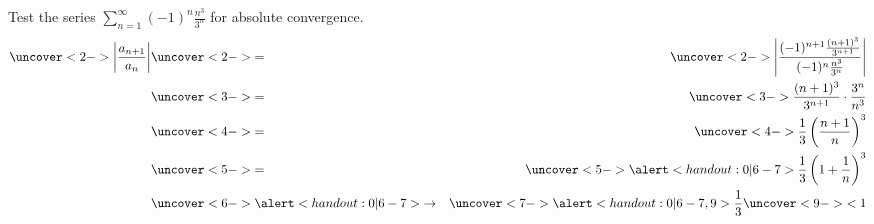\begin{frame}
\begin{example}[Example 4, p. 753]
Test the series $\displaystyle \sum_{n=1}^\infty (-1)^n \frac{n^3}{3^n}$ for absolute convergence.
\abovedisplayskip=0pt
\belowdisplayskip=0pt
\begin{eqnarray*}
\uncover<2->{%
\left| \frac{a_{n+1}}{a_n}\right| %
}%
 & \uncover<2->{=} & %
\uncover<2->{%
\left| \frac{(-1)^{n+1}\frac{(n+1)^3}{3^{n+1}}}{(-1)^n\frac{n^3}{3^n}}\right| %
}\\%
 & \uncover<3->{=} & %
\uncover<3->{%
\frac{(n+1)^3}{3^{n+1}}\cdot \frac{3^n}{n^3}%
}\\%
 & \uncover<4->{=} & %
\uncover<4->{%
\frac{1}{3} \left( \frac{n+1}{n}\right)^3%
}\\%
 & \uncover<5->{=} & %
\uncover<5->{%
\alert<handout:0| 6-7>{%
\frac{1}{3} \left( 1 + \frac{1}{n}\right)^3%
}%
}\\%
 & \uncover<6->{\alert<handout:0| 6-7>{\to}} & %
\uncover<7->{%
\alert<handout:0| 6-7,9>{%
\frac{1}{3} \uncover<9->{ < 1 }
}%
}%
\end{eqnarray*}
%
\end{example}
\end{frame}
